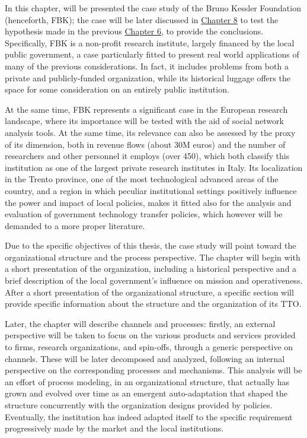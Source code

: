 

\label{Chapter7}

In this chapter, will be presented the case study of the Bruno Kessler Foundation (henceforth, FBK); the case will be later discussed in \hyperref[Chapter8]{Chapter 8} to test the hypothesis made in the previous \hyperref[Chapter6]{Chapter 6}, to provide the conclusions. Specifically, FBK is a non-profit research institute, largely financed by the local public government, a case particularly fitted to present real world applications of many of the previous considerations. In fact, it includes problems from both a private and publicly-funded organization, while its historical luggage offers the space for some consideration on an entirely public institution. 

At the same time, FBK represents a significant case in the European research landscape, where its importance will be tested with the aid of social network analysis tools. At the same time, its relevance can also be assessed by the proxy of its dimension, both in revenue flows (about 30M euros) and the number of researchers and other personnel it employs (over 450), which both classify this institution as one of the largest private research institutes in Italy. Its localization in the Trento province, one of the most technological advanced areas of the country, and a region in which peculiar institutional settings positively influence the power and impact of local policies, makes it fitted also for the analysis and evaluation of government technology transfer policies, which however will be demanded to a more proper literature.

Due to the specific objectives of this thesis, the case study will point toward the organizational structure and the process perspective. The chapter will begin with a short presentation of the organization, including a historical perspective and a brief description of the local government's influence on mission and operativeness. After a short presentation of the organizational structure, a specific section will provide specific information about the structure and the organization of its TTO.

Later, the chapter will describe channels and processes: firstly, an external perspective will be taken to focus on the various products and services provided to firms, research organizations, and spin-offs, through a generic perspective on channels. These will be later decomposed and analyzed, following an internal perspective on the corresponding processes and mechanisms. This analysis will be an effort of process modeling, in an organizational structure, that actually has grown and evolved over time as an emergent auto-adaptation that shaped the structure concurrently with the organization designs provided by policies. Eventually, the institution has indeed adapted itself to the specific requirement progressively made by the market and the local institutions. 

